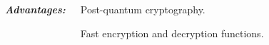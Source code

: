 \documentclass[
10pt, %
%
aspectratio=169, %
]{beamer}
\newenvironment{variableblock}[3]{%
	\setbeamercolor{block body}{#2}
	\setbeamercolor{block title}{#3}
	\begin{block}{#1}}{\end{block}}
\theoremstyle{plain}%
\theoremstyle{definition}
\theoremstyle{remark}
\newcommand{\calA}{\mathcal{A}}
\newcommand{\calC}{\mathcal{C}}
\newcommand{\fq}{\mathbb{F}_{q}}
\begin{document}
\begin{frame}
		\begin{columns}[T,onlytextwidth]
			\textcolor{palatinatepurple}{\textbf{\textit{Advantages:}}}
			\begin{dinglist}{52}
				\item Post-quantum cryptography.
				\item Fast encryption and decryption functions.
			\end{dinglist}
%				

\end{columns}
\end{frame}
\end{document}
